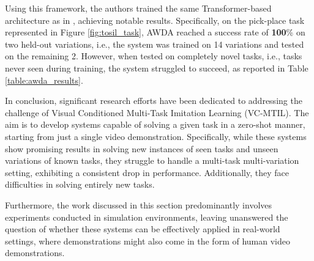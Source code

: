 Using this framework, the authors trained the same Transformer-based architecture as in \cite{dasari2021transformers_one_shot}, achieving notable results. Specifically, on the pick-place task represented in Figure \ref{fig:tosil_task}, AWDA reached a success rate of \textbf{100}\% on two held-out variations, i.e., the system was trained on 14 variations and tested on the remaining 2. However, when tested on completely novel tasks, i.e., tasks never seen during training, the system struggled to succeed, as reported in Table \ref{table:awda_results}.


In conclusion, significant research efforts have been dedicated to addressing the challenge of Visual Conditioned Multi-Task Imitation Learning (VC-MTIL). The aim is to develop systems capable of solving a given task in a zero-shot manner, starting from just a single video demonstration. Specifically, while these systems show promising results in solving new instances of seen tasks and unseen variations of known tasks, they struggle to handle a  multi-task multi-variation setting, exhibiting a consistent drop in performance. Additionally, they face difficulties in solving entirely new tasks.

Furthermore, the work discussed in this section predominantly involves experiments conducted in simulation environments, leaving unanswered the question of whether these systems can be effectively applied in real-world settings, where demonstrations might also come in the form of human video demonstrations.
